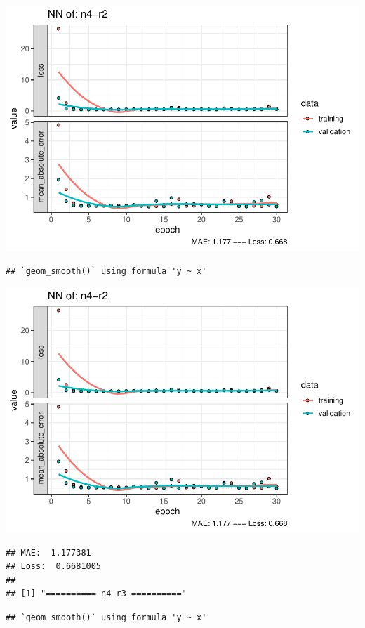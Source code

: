 \documentclass[
]{article}
\begin{document}
\includegraphics{project-code_files/figure-latex/unnamed-chunk-18-31.pdf}

\begin{verbatim}
## `geom_smooth()` using formula 'y ~ x'
\end{verbatim}

\includegraphics{project-code_files/figure-latex/unnamed-chunk-18-32.pdf}

\begin{verbatim}
## MAE:  1.177381
## Loss:  0.6681005 
## 
## [1] "========== n4-r3 =========="
\end{verbatim}

\begin{verbatim}
## `geom_smooth()` using formula 'y ~ x'
\end{verbatim}
\end{document}
